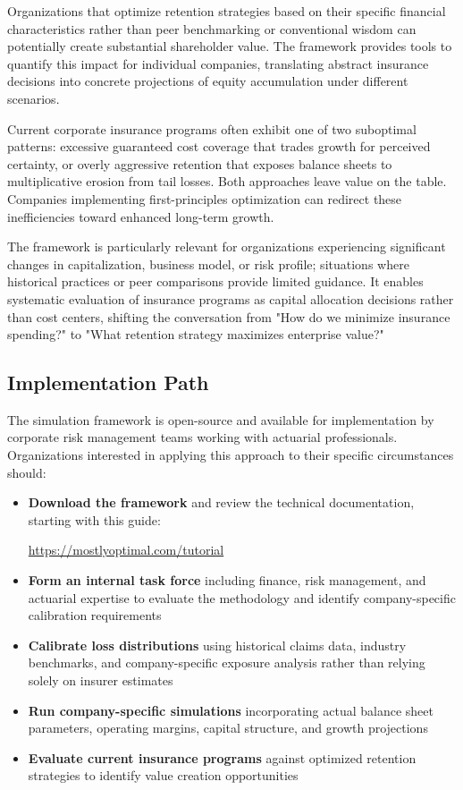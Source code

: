 \documentclass[11pt,letterpaper]{article}
\begin{document}
Organizations that optimize retention strategies based on their specific financial characteristics rather than peer benchmarking or conventional wisdom can potentially create substantial shareholder value. The framework provides tools to quantify this impact for individual companies, translating abstract insurance decisions into concrete projections of equity accumulation under different scenarios.

Current corporate insurance programs often exhibit one of two suboptimal patterns: excessive guaranteed cost coverage that trades growth for perceived certainty, or overly aggressive retention that exposes balance sheets to multiplicative erosion from tail losses. Both approaches leave value on the table. Companies implementing first-principles optimization can redirect these inefficiencies toward enhanced long-term growth.

The framework is particularly relevant for organizations experiencing significant changes in capitalization, business model, or risk profile; situations where historical practices or peer comparisons provide limited guidance. It enables systematic evaluation of insurance programs as capital allocation decisions rather than cost centers, shifting the conversation from "How do we minimize insurance spending?" to "What retention strategy maximizes enterprise value?"

\subsection{Implementation Path}

The simulation framework is open-source and available for implementation by corporate risk management teams working with actuarial professionals. Organizations interested in applying this approach to their specific circumstances should:

\begin{itemize}
    \item \textbf{Download the framework} and review the technical documentation, starting with this guide:

        \url{https://mostlyoptimal.com/tutorial}

    \item \textbf{Form an internal task force} including finance, risk management, and actuarial expertise to evaluate the methodology and identify company-specific calibration requirements
    \item \textbf{Calibrate loss distributions} using historical claims data, industry benchmarks, and company-specific exposure analysis rather than relying solely on insurer estimates
    \item \textbf{Run company-specific simulations} incorporating actual balance sheet parameters, operating margins, capital structure, and growth projections
    \item \textbf{Evaluate current insurance programs} against optimized retention strategies to identify value creation opportunities
\end{itemize}
\end{document}
